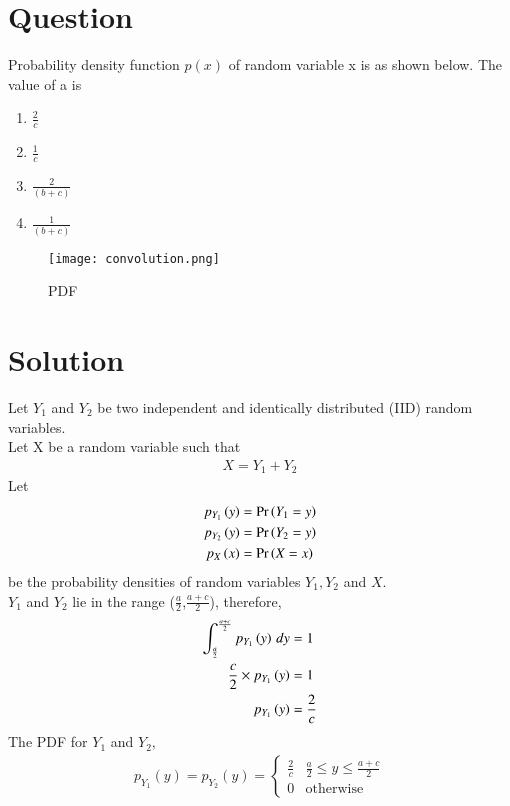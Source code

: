 \documentclass[journal,12pt,twocolumn]{IEEEtran}
\begin{document}
\section*{Question}
Probability density function $p(x)$ of random variable x is as shown below. The value of a is
\begin{enumerate}[label=\Alph*)]
    \item $\frac{2}{c}$
    \item $\frac{1}{c}$
    \item $\frac{2}{(b+c)}$
    \item $\frac{1}{(b+c)}$
\end{enumerate}
\begin{figure}[h!]
\centering
\texttt{[image: convolution.png]}
\caption{PDF}
\label{fig:BSC}
\end{figure}
\section*{Solution}

Let $Y_1$ and $Y_2$ be two independent and identically distributed (IID) random variables.\\
Let X be a random variable such that
\begin{align}
    X = Y_1 + Y_2
\end{align}
Let
\begin{align}
    p_{Y_1}\left(y\right) &= \Pr\left(Y_1=y\right) \\
    p_{Y_2}\left(y\right) &= \Pr\left(Y_2=y\right) \\
    p_X\left(x\right) &= \Pr\left(X=x\right)
\end{align}
be the probability densities of random variables $Y_1, Y_2$ and $X$. \\
$Y_1$ and $Y_2$ lie in the range ($\frac{a}{2}$,$\frac{a+c}{2}$), therefore,
\begin{align}
    \int_{\frac{a}{2}}^{\frac{a+c}{2}} p_{Y_1}\left(y\right) \,dy  &=1 \\
    \frac{c}{2} \times p_{Y_1}\left(y\right)  &= 1 \\
     p_{Y_1}\left(y\right) &= \frac{2}{c}
\end{align}
The PDF for $Y_1$ and $Y_2$,
\begin{align}
p_{Y_1}(y) = p_{Y_2}(y) = 
\begin{cases}
\frac{2}{c} &  \frac{a}{2} \le y \le \frac{a+c}{2}\\
0 & \text{otherwise}
\end{cases}
\end{align}
\end{document}
